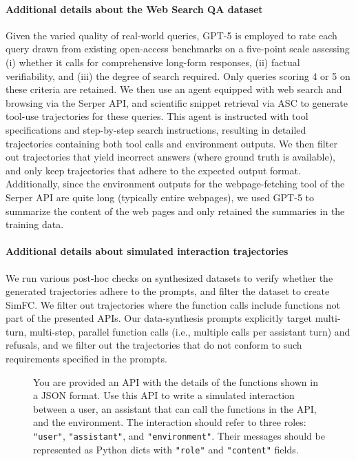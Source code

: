 \documentclass[table]{ai2style/ai2}
\begin{document}
{{\paragraph{Additional details about the Web Search QA dataset} Given the varied quality of real-world queries, GPT-5 is employed to rate each query drawn from existing open-access benchmarks on a five-point scale assessing (i) whether it calls for comprehensive long-form responses, (ii) factual verifiability, and (iii) the degree of search required. Only queries scoring 4 or 5 on these criteria are retained. We then use an agent equipped with web search and browsing via the Serper API, and scientific snippet retrieval via ASC to generate tool-use trajectories for these queries. This agent is instructed with tool specifications and step-by-step search instructions, resulting in detailed trajectories containing both tool calls and environment outputs. We then filter out trajectories that yield incorrect answers (where ground truth is available), and only keep trajectories that adhere to the expected output format. Additionally, since the environment outputs for the webpage-fetching tool of the Serper API are quite long (typically entire webpages), we used GPT-5 to summarize the content of the web pages and only retained the summaries in the training data.

\paragraph{Additional details about simulated interaction trajectories} We run various post-hoc checks on synthesized datasets to verify whether the generated trajectories adhere to the prompts, and filter the dataset to create SimFC. We filter out trajectories where the function calls include functions not part of the presented APIs. Our data-synthesis prompts explicitly target multi-turn, multi-step, parallel function calls (i.e., multiple calls per assistant turn) and refusals, and we filter out the trajectories that do not conform to such requirements specified in the prompts.

\begin{figure}[h]
\begin{prompt}{}\footnotesize

You are provided an API with the details of the functions shown in a JSON format. Use this API to write a simulated interaction between a user, an assistant that can call the functions in the API, and the environment. The interaction should refer to three roles: \texttt{"user"}, \texttt{"assistant"}, and \texttt{"environment"}. Their messages should be represented as Python dicts with \texttt{"role"} and \texttt{"content"} fields. \\


\end{prompt}
\end{figure}}}
\end{document}
